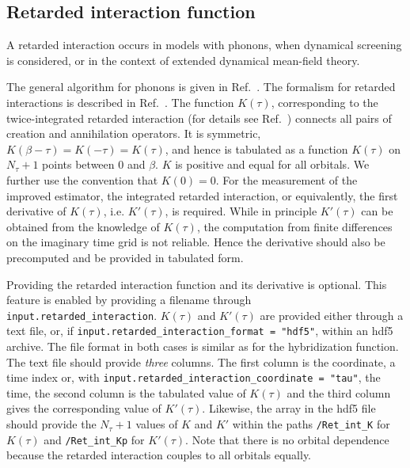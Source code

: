 \documentclass[aps,prb,floatfix,superscriptaddress,twocolumn,notitlepage]{revtex4-1}
\begin{document}
\subsection{Retarded interaction function}
\label{k_ret_int}
A retarded interaction occurs in models with phonons, when dynamical screening is considered, or in the context of extended dynamical mean-field theory.

The general algorithm for phonons is given in Ref.~. The formalism for retarded interactions is described in Ref.~. The function $K(\tau)$, corresponding to the twice-integrated retarded interaction (for details see Ref.~) connects all pairs of creation and annihilation operators. It is symmetric, $K(\beta-\tau)=K(-\tau)=K(\tau)$, and hence is tabulated as a function $K(\tau)$ on $N_{\tau}+1$ points between $0$ and $\beta$. $K$ is positive and equal for all orbitals. We further use the convention that $K(0)=0$. For the measurement of the improved estimator, the integrated retarded interaction, or equivalently, the first derivative of $K(\tau)$, i.e. $K'(\tau)$, is required. While in principle $K'(\tau)$ can be obtained from the knowledge of $K(\tau)$, the computation from finite differences on the imaginary time grid is not reliable. Hence the derivative should also be precomputed and be provided in tabulated form.

Providing the retarded interaction function and its derivative is optional. This feature is enabled by providing a filename through \verb#input.retarded_interaction#.
$K(\tau)$ and $K'(\tau)$ are provided either through a text file, or, if \verb#input.retarded_interaction_format = "hdf5"#, within an hdf5 archive.
The file format in both cases is similar as for the hybridization function. The text file should provide \emph{three} columns. The first column is the coordinate, a time index or, with \verb#input.retarded_interaction_coordinate = "tau"#, the time, the second column is the tabulated value of $K(\tau)$ and the third column gives the corresponding value of $K'(\tau)$.
Likewise, the array in the hdf5 file should provide the $N_{\tau}+1$ values of $K$ and $K'$ within the paths \verb#/Ret_int_K# for $K(\tau)$ and \verb#/Ret_int_Kp# for $K'(\tau)$.
Note that there is no orbital dependence because the retarded interaction couples to all orbitals equally.
\end{document}
